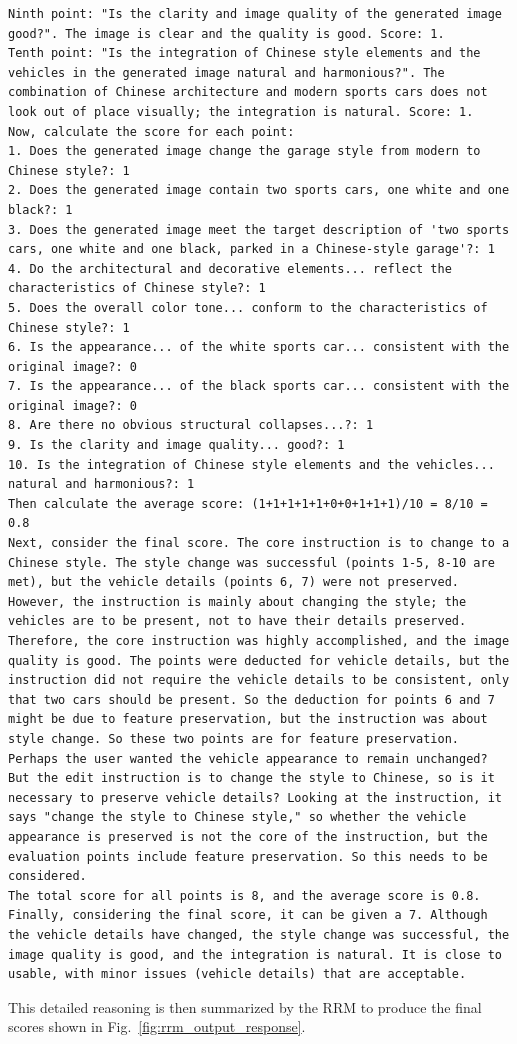 \begin{lstlisting}
Ninth point: "Is the clarity and image quality of the generated image good?". The image is clear and the quality is good. Score: 1.
Tenth point: "Is the integration of Chinese style elements and the vehicles in the generated image natural and harmonious?". The combination of Chinese architecture and modern sports cars does not look out of place visually; the integration is natural. Score: 1.
Now, calculate the score for each point:
1. Does the generated image change the garage style from modern to Chinese style?: 1
2. Does the generated image contain two sports cars, one white and one black?: 1
3. Does the generated image meet the target description of 'two sports cars, one white and one black, parked in a Chinese-style garage'?: 1
4. Do the architectural and decorative elements... reflect the characteristics of Chinese style?: 1
5. Does the overall color tone... conform to the characteristics of Chinese style?: 1
6. Is the appearance... of the white sports car... consistent with the original image?: 0
7. Is the appearance... of the black sports car... consistent with the original image?: 0
8. Are there no obvious structural collapses...?: 1
9. Is the clarity and image quality... good?: 1
10. Is the integration of Chinese style elements and the vehicles... natural and harmonious?: 1
Then calculate the average score: (1+1+1+1+1+0+0+1+1+1)/10 = 8/10 = 0.8
Next, consider the final score. The core instruction is to change to a Chinese style. The style change was successful (points 1-5, 8-10 are met), but the vehicle details (points 6, 7) were not preserved. However, the instruction is mainly about changing the style; the vehicles are to be present, not to have their details preserved. Therefore, the core instruction was highly accomplished, and the image quality is good. The points were deducted for vehicle details, but the instruction did not require the vehicle details to be consistent, only that two cars should be present. So the deduction for points 6 and 7 might be due to feature preservation, but the instruction was about style change. So these two points are for feature preservation. Perhaps the user wanted the vehicle appearance to remain unchanged? But the edit instruction is to change the style to Chinese, so is it necessary to preserve vehicle details? Looking at the instruction, it says "change the style to Chinese style," so whether the vehicle appearance is preserved is not the core of the instruction, but the evaluation points include feature preservation. So this needs to be considered.
The total score for all points is 8, and the average score is 0.8. Finally, considering the final score, it can be given a 7. Although the vehicle details have changed, the style change was successful, the image quality is good, and the integration is natural. It is close to usable, with minor issues (vehicle details) that are acceptable.
\end{lstlisting}
This detailed reasoning is then summarized by the RRM to produce the final scores shown in Fig.~\ref{fig:rrm_output_response}.

